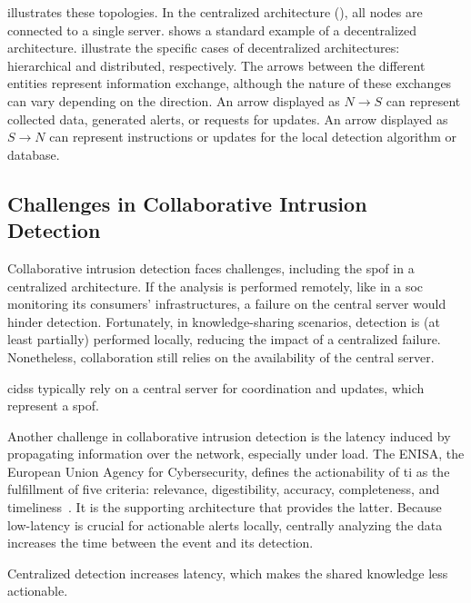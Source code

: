  illustrates these topologies.
In the centralized architecture (), all nodes are connected to a single server.
 shows a standard example of a decentralized architecture.
 illustrate the specific cases of decentralized architectures: hierarchical and distributed, respectively.
The arrows between the different entities represent information exchange, although the nature of these exchanges can vary depending on the direction.
An arrow displayed as $N \rightarrow S$ can represent collected data, generated alerts, or requests for updates.
An arrow displayed as $S \rightarrow N$ can represent instructions or updates for the local detection algorithm or database.

\subsection{Challenges in Collaborative Intrusion Detection\label{sec:bg.collab.challenges}}

Collaborative intrusion detection faces challenges, including the \gls{spof} in a centralized architecture.
If the analysis is performed remotely, like in a \gls{soc} monitoring its consumers' infrastructures, a failure on the central server would hinder detection.
Fortunately, in knowledge-sharing scenarios, detection is (at least partially) performed locally, reducing the impact of a centralized failure.
Nonetheless, collaboration still relies on the availability of the central server.

\begin{challenge}
  \Glspl{cids} typically rely on a central server for coordination and updates, which represent a \acrfull{spof}.
  \label{chall:spof}
\end{challenge}

Another challenge in collaborative intrusion detection is the latency induced by propagating information over the network, especially under load.
The ENISA, the European Union Agency for Cybersecurity, defines the actionability of \gls{ti} as the fulfillment of five criteria: relevance, digestibility, accuracy, completeness, and timeliness~\cite{ENISA2014}.
It is the supporting architecture that provides the latter.
Because low-latency is crucial for actionable alerts locally, centrally analyzing the data increases the time between the event and its detection.

\begin{challenge}
  Centralized detection increases latency, which makes the shared knowledge less actionable.
  \label{chall:actionability}
\end{challenge}

